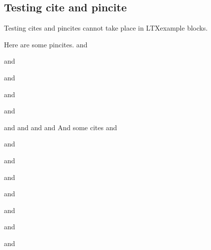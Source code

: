 \documentclass[12pt,\documentclassflag]{lawbrief}
\begin{document}
\subsection{Testing cite and pincite}
Testing cites and pincites cannot take place in LTXexample blocks.

  Here are some pincites.
   and \par
   and \par
   and \par 
   and \par
   and \par
   and 
   and 
   and  
   and 
  And some cites  and \par
  \cite{A} and \par
  \cite{A} and \par
  \cite{A} and \par
  \cite{A} and \par
  \cite{A} and \par
  \cite{A} and \par
  \cite{A} and \par
 
\end{document}
